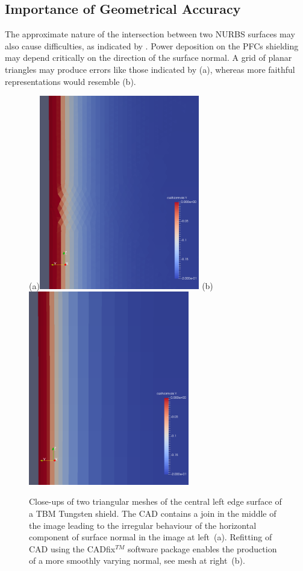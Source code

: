 \subsection{Importance of Geometrical Accuracy} \label{sec:codegeom}
The approximate nature of the intersection between two NURBS surfaces may also cause
difficulties, as indicated by . Power deposition
on the PFCs shielding may depend critically on the direction of the surface normal.
A grid of planar triangles may produce errors like those indicated by
(a), whereas more faithful representations would resemble
(b).
\begin{figure}[h]
\centerline{(a){\includegraphics[width=7.0cm]{../png/meshbad.png}}
(b) {\includegraphics[width=7.0cm]{../png/meshgood.png}}
}
\caption{Close-ups of two triangular meshes of the central left edge surface
of a TBM Tungsten shield.  The  CAD contains a join in the middle of the image
leading to the irregular behaviour of the horizontal component of surface normal
in the image at left~(a). Refitting of CAD using the CADfix$^{TM}$ software package
enables the production of a more smoothly
varying normal, see mesh at right~(b).
\label{fig:meshes}}
\end{figure}




